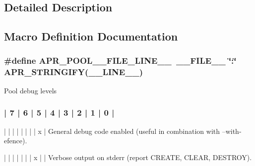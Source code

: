 \subsection{Detailed Description}


\subsection{Macro Definition Documentation}
\subsubsection[{\texorpdfstring{A\+P\+R\+\_\+\+P\+O\+O\+L\+\_\+\+\_\+\+F\+I\+L\+E\+\_\+\+L\+I\+N\+E\+\_\+\+\_\+}{APR_POOL__FILE_LINE__}}]{\setlength{\rightskip}{0pt plus 5cm}\#define A\+P\+R\+\_\+\+P\+O\+O\+L\+\_\+\+\_\+\+F\+I\+L\+E\+\_\+\+L\+I\+N\+E\+\_\+\+\_\+~\+\_\+\+\_\+\+F\+I\+L\+E\+\_\+\+\_\+ \char`\"{}\+:\char`\"{} {\bf A\+P\+R\+\_\+\+S\+T\+R\+I\+N\+G\+I\+FY}(\+\_\+\+\_\+\+L\+I\+N\+E\+\_\+\+\_\+)}\hypertarget{group__apr__pools_gac81cff34d0ff4be52fa924663478eade}{}\label{group__apr__pools_gac81cff34d0ff4be52fa924663478eade}
Pool debug levels


\begin{DoxyPre}
\subsubsection*{| 7 | 6 | 5 | 4 | 3 | 2 | 1 | 0 |
}\end{DoxyPre}



\begin{DoxyPre}
|   |   |   |   |   |   |   | x |  General debug code enabled (useful in
                                   combination with --with-efence).\end{DoxyPre}



\begin{DoxyPre}|   |   |   |   |   |   | x |   |  Verbose output on stderr (report
                                   CREATE, CLEAR, DESTROY).\end{DoxyPre}



